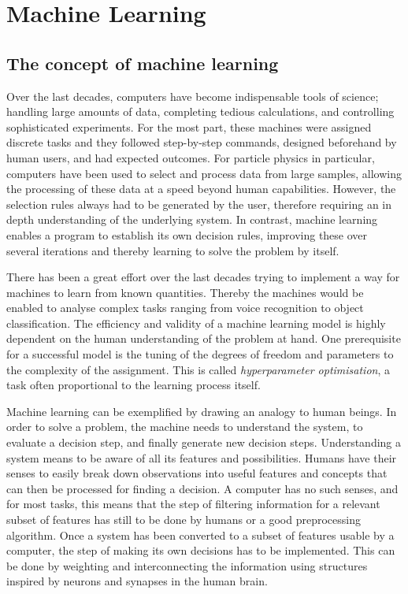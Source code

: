 \chapter{Machine Learning}
\label{chp:ml}

\section{The concept of machine learning}

Over the last decades, computers have become indispensable tools of science; handling large amounts of data, completing tedious calculations, and controlling sophisticated experiments. For the most part, these  machines were assigned discrete tasks and they followed step-by-step commands, designed beforehand by human users, and had expected outcomes. 
For particle physics in particular, computers have been used to select and process data from large samples, allowing the processing of these data at a speed beyond human capabilities. However, the selection rules always had to be generated by the user, therefore requiring an in depth understanding of the underlying system. In contrast, machine learning enables a program to establish its own decision rules, improving these over several iterations and thereby learning to solve the problem by itself.

There has been a great effort over the last decades trying to implement a way for machines to learn from known quantities. Thereby the machines would be enabled to analyse complex tasks ranging from voice recognition to object classification.
The efficiency and validity of a machine learning model is highly dependent on the human understanding of the problem at hand. One prerequisite for a successful model is the tuning of the degrees of freedom and parameters to the complexity of the assignment. This is called \emph{hyperparameter optimisation}, a task often proportional to the learning process itself.


Machine learning can be exemplified by drawing an analogy to human beings. In order to solve a problem, the machine needs to understand the system, to evaluate a decision step, and finally generate new decision steps.
Understanding a system means to be aware of all its features and possibilities. Humans have their senses to easily break down observations into useful features and concepts that can then be processed for finding a decision. A computer has no such senses, and for most tasks, this means that the step of filtering information for a relevant subset of features has still to be done by humans or a good preprocessing algorithm.
Once a system has been converted to a subset of features usable by a computer, the step of making its own decisions has to be implemented. This can be done by weighting and interconnecting the information using structures inspired by neurons and synapses in the human brain. 


